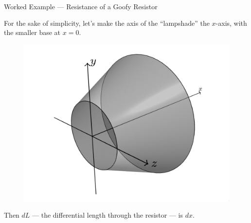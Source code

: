 \documentclass{beamer}
\begin{document}
\begin{frame}{Worked Example --- Resistance of a Goofy Resistor}

For the sake of simplicity, let's make the axis of the ``lampshade'' the $x$-axis, with the smaller base at $x = 0$.

\begin{figure}[H]
\centering
\includegraphics[height=0.5\textheight]{figures/lamponx.png}
\end{figure}

Then $dL$ --- the differential length through the resistor --- is $dx$.

\end{frame}
\end{document}
